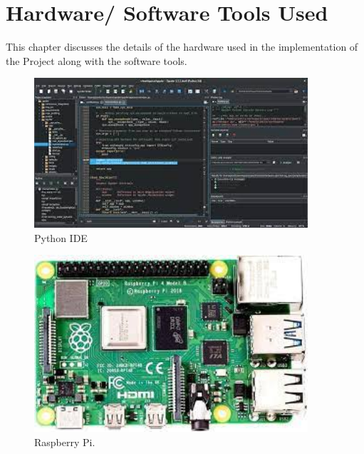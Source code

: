 \chapter{Hardware/ Software Tools Used}
This chapter discusses the details of the hardware used in the implementation of the Project along with the software tools.

\begin{figure}[ht]
	\centering
	\includegraphics[width=4in]{figures/python_editor.jpg}
	\caption{Python IDE  \label{fig:python_editor}}
\end{figure}


\begin{figure}[ht]
	\centering
	\includegraphics[width=4in]{figures/raspberi.jpg}
	\caption{Raspberry Pi.  \label{fig:raspberi}}
\end{figure}
